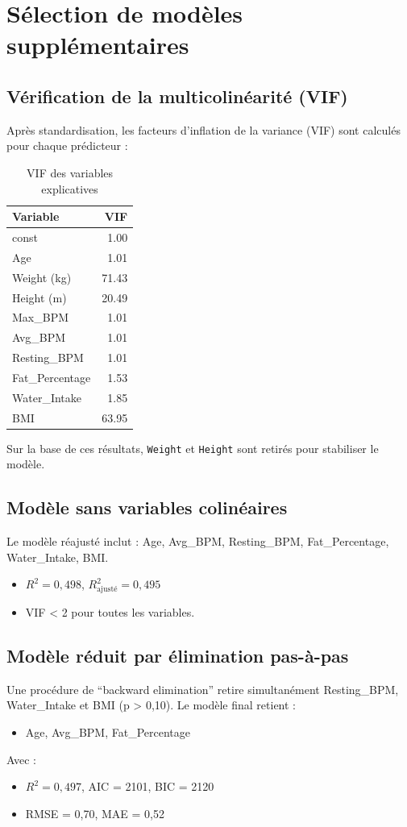 \documentclass[12pt,a4paper]{article}
\begin{document}
\section{Sélection de modèles supplémentaires}

\subsection{Vérification de la multicolinéarité (VIF)}
Après standardisation, les facteurs d'inflation de la variance (VIF) sont calculés pour chaque prédicteur :

\begin{table}[H]
\centering
\caption{VIF des variables explicatives}
\begin{tabular}{l r}
\toprule
Variable & VIF \\
\midrule
const & 1.00 \\
Age & 1.01 \\
Weight (kg) & 71.43 \\
Height (m) & 20.49 \\
Max\_BPM & 1.01 \\
Avg\_BPM & 1.01 \\
Resting\_BPM & 1.01 \\
Fat\_Percentage & 1.53 \\
Water\_Intake & 1.85 \\
BMI & 63.95 \\
\bottomrule
\end{tabular}
\end{table}

Sur la base de ces résultats, \texttt{Weight} et \texttt{Height} sont retirés pour stabiliser le modèle.

\subsection{Modèle sans variables colinéaires}
Le modèle réajusté inclut : Age, Avg\_BPM, Resting\_BPM, Fat\_Percentage, Water\_Intake, BMI.
\begin{itemize}
\item $R^2 = 0{,}498$, $R^2_{\text{ajusté}} = 0{,}495$
\item VIF < 2 pour toutes les variables.
\end{itemize}

\subsection{Modèle réduit par élimination pas-à-pas}
Une procédure de ``backward elimination'' retire simultanément Resting\_BPM, Water\_Intake et BMI (p > 0,10). Le modèle final retient :
\begin{itemize}
\item Age, Avg\_BPM, Fat\_Percentage
\end{itemize}
Avec :
\begin{itemize}
\item $R^2 = 0{,}497$, AIC = 2101, BIC = 2120
\item RMSE = 0{,}70, MAE = 0{,}52
\end{itemize}
\end{document}
